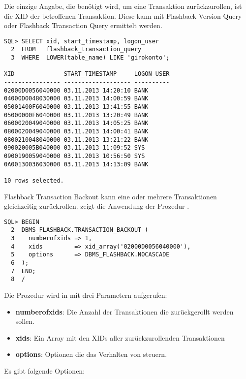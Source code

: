           Die einzige Angabe, die ben\"otigt wird, um eine Transaktion zur\"uckzurollen, ist die XID der betroffenen Transaktion. Diese kann mit Flashback Version Query oder Flashback Transaction Query ermittelt werden.
          \begin{lstlisting}[caption={Die XID einer Transaktion ermitteln},label=admin1712,language=oracle_sql]
SQL> SELECT xid, start_timestamp, logon_user
  2  FROM   flashback_transaction_query
  3  WHERE  LOWER(table_name) LIKE 'girokonto';

XID              START_TIMESTAMP     LOGON_USER
---------------- ------------------- ----------
02000D0056040000 03.11.2013 14:20:10 BANK
04000D0048030000 03.11.2013 14:00:59 BANK
05001400F6040000 03.11.2013 13:41:55 BANK
05000000F6040000 03.11.2013 13:20:49 BANK
0600020049040000 03.11.2013 14:05:25 BANK
0800020049040000 03.11.2013 14:00:41 BANK
0800210048040000 03.11.2013 13:21:22 BANK
090020005B040000 03.11.2013 11:09:52 SYS
0900190059040000 03.11.2013 10:56:50 SYS
0A00130036030000 03.11.2013 14:13:09 BANK

10 rows selected.
          \end{lstlisting}
          Flashback Transaction Backout kann eine oder mehrere Transaktionen gleichzeitig zur\"uckrollen.  zeigt die Anwendung der Prozedur .
          \begin{lstlisting}[caption={Eine best\"atigte Transaktion zur\"uckrollen},label=admin1713,language=plsql]
SQL> BEGIN
  2  DBMS_FLASHBACK.TRANSACTION_BACKOUT (
  3    numberofxids => 1,
  4    xids         => xid_array('02000D0056040000'),
  5    options      => DBMS_FLASHBACK.NOCASCADE
  6  );
  7  END;
  8  /
          \end{lstlisting}
          Die Prozedur  wird in  mit drei Parametern aufgerufen:
          \begin{itemize}
            \item \textbf{numberofxids}: Die Anzahl der Transaktionen die zur\"uckgerollt werden sollen.
            \item \textbf{xids}: Ein Array mit den XIDs aller zur\"uckzurollenden Transaktionen
            \item \textbf{options}: Optionen die das Verhalten von  steuern.
          \end{itemize}
\clearpage
          Es gibt folgende Optionen:
